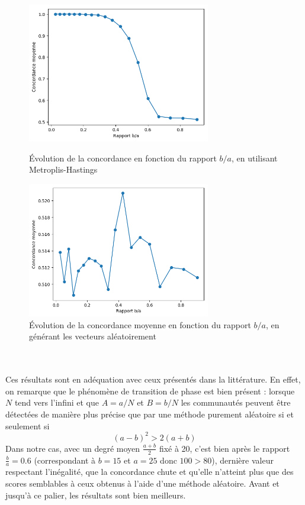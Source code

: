 \documentclass[a4paper, 11pt]{article}
\begin{document}
\begin{figure}[h!]
    \begin{minipage}{.5\textwidth}
        \centering
        \includegraphics[width=8cm]{evol_mean_concordance.png}
        \caption{Évolution de la concordance en fonction du rapport $b/a$, en utilisant Metroplis-Hastings}
    \end{minipage}
    \hspace{0.2cm}
    \begin{minipage}{.5\textwidth}
        \centering
        \includegraphics[width=8cm]{evol_random_mean_concordance.png}
        \caption{Évolution de la concordance moyenne en fonction du rapport $b/a$, en générant les vecteurs aléatoirement}
        \label{aleatoire}
    \end{minipage}
\end{figure}\\\\

Ces résultats sont en adéquation avec ceux présentés dans la littérature.\cite{Sweets} \cite{Demaine2007} En effet, on remarque que le phénomène de transition de phase est bien présent : lorsque $N$ tend vers l’infini et que $A=a/N$ et $B=b/N$ les communautés peuvent être détectées de manière plus précise que par une méthode purement aléatoire si et seulement si 
$$(a-b)^2 > 2(a+b)$$
Dans notre cas, avec un degré moyen $\frac{a+b}{2}$ fixé à 20, c'est bien après le rapport $\frac{b}{a} = 0.6$ (correspondant à $b=15$ et $a=25$ donc $100 > 80$), dernière valeur respectant l'inégalité, que la concordance chute et qu'elle n'atteint plus que des scores semblables à ceux obtenus à l'aide d'une méthode aléatoire. Avant et jusqu'à ce palier, les résultats sont bien meilleurs.\\
\end{document}
